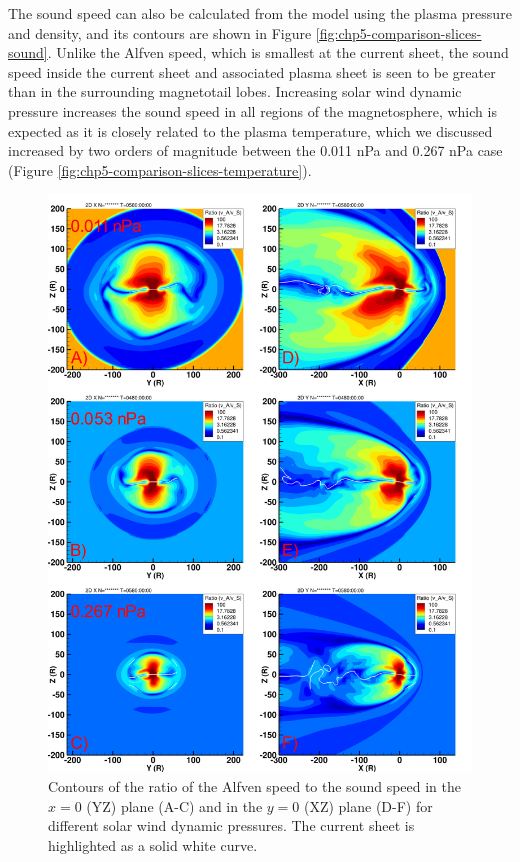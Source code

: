 The sound speed can also be calculated from the model using the plasma pressure and density, and its contours are shown in Figure \ref{fig:chp5-comparison-slices-sound}. Unlike the Alfven speed, which is smallest at the current sheet, the sound speed inside the current sheet and associated plasma sheet is seen to be greater than in the surrounding magnetotail lobes. Increasing solar wind dynamic pressure increases the sound speed in all regions of the magnetosphere, which is expected as it is closely related to the plasma temperature, which we discussed increased by two orders of magnitude between the 0.011 nPa and 0.267 nPa case (Figure \ref{fig:chp5-comparison-slices-temperature}). 

\begin{figure}
    \centering
    \includegraphics[height=0.9\textheight]{images5/compare_runs_currentsheet_RatioAlfvenSonic.png}
    \caption{Contours of the ratio of the Alfven speed to the sound speed in the $x=0$ (YZ) plane (A-C) and in the $y=0$ (XZ) plane (D-F) for different solar wind dynamic pressures. The current sheet is highlighted as a solid white curve.}
    \label{fig:chp5-comparison-slices-ratioalfvensound}
\end{figure}

